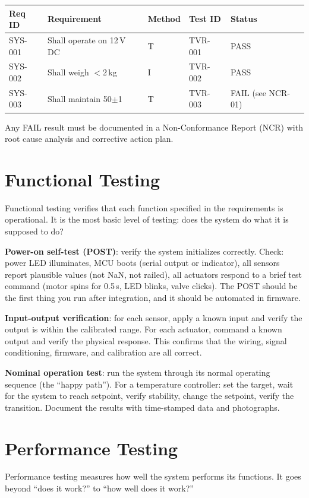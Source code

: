\begin{greenshieldbox}
\begin{tabularx}{\textwidth}{l l l l l}
\toprule
\textbf{Req ID} & \textbf{Requirement} & \textbf{Method} & \textbf{Test ID} & \textbf{Status} \\
\midrule
SYS-001 & Shall operate on 12\,V DC & T & TVR-001 & PASS \\
SYS-002 & Shall weigh $<$2\,kg & I & TVR-002 & PASS \\
SYS-003 & Shall maintain 50$\pm$1\,\degC{} & T & TVR-003 & FAIL (see NCR-01) \\
\bottomrule
\end{tabularx}
Any FAIL result must be documented in a Non-Conformance Report (NCR) with root cause analysis and corrective action plan.
\end{greenshieldbox}

\section{Functional Testing}
Functional testing verifies that each function specified in the requirements is operational. It is the most basic level of testing: does the system do what it is supposed to do?

\textbf{Power-on self-test (POST)}: verify the system initializes correctly. Check: power LED illuminates, MCU boots (serial output or indicator), all sensors report plausible values (not NaN, not railed), all actuators respond to a brief test command (motor spins for 0.5\,s, LED blinks, valve clicks). The POST should be the first thing you run after integration, and it should be automated in firmware.

\textbf{Input-output verification}: for each sensor, apply a known input and verify the output is within the calibrated range. For each actuator, command a known output and verify the physical response. This confirms that the wiring, signal conditioning, firmware, and calibration are all correct.

\textbf{Nominal operation test}: run the system through its normal operating sequence (the ``happy path''). For a temperature controller: set the target, wait for the system to reach setpoint, verify stability, change the setpoint, verify the transition. Document the results with time-stamped data and photographs.

\section{Performance Testing}
Performance testing measures how well the system performs its functions. It goes beyond ``does it work?'' to ``how well does it work?''

